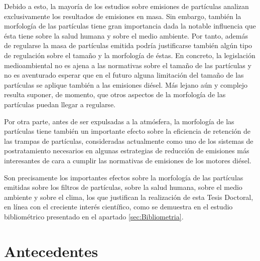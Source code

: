 \par Debido a esto, la mayoría de los estudios sobre emisiones de  partículas analizan exclusivamente los resultados de emisiones en masa. Sin embargo, también la  morfología de las partículas tiene gran importancia dada la notable influencia que ésta tiene sobre la salud humana y sobre el medio ambiente. Por tanto, además de regularse la masa de partículas emitida podría justificarse también algún tipo de regulación sobre el tamaño y la morfología de éstas. En concreto, la legislación medioambiental no es ajena a las normativas sobre el tamaño de las partículas y no es aventurado esperar que en el futuro alguna limitación del tamaño de las partículas se aplique también a las emisiones diésel. Más lejano aún y complejo resulta suponer, de momento, que otros aspectos de la morfología de las partículas puedan llegar a regularse.

\par Por otra parte, antes de ser expulsadas a la atmósfera, la morfología de las partículas tiene también un importante efecto sobre la eficiencia de retención de las  trampas de partículas, consideradas actualmente como uno de los sistemas de postratamiento necesarios en algunas estrategias de reducción de emisiones más interesantes de cara a cumplir las normativas de emisiones de los motores diésel.

\par Son precisamente los importantes efectos sobre la morfología de las partículas emitidas sobre los filtros de partículas, sobre la salud humana, sobre el medio ambiente y sobre el clima, los que justifican la realización de esta Tesis Doctoral, en línea con el creciente interés científico, como se demuestra en el estudio bibliométrico presentado en el apartado \ref{sec:Bibliometria}.

\section{Antecedentes}\label{sec:Antecedentes}

